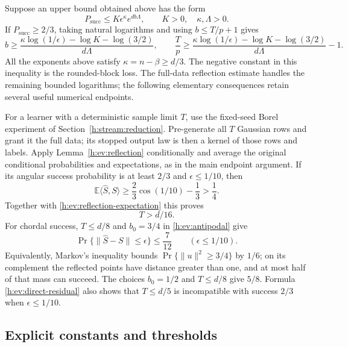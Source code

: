 Suppose an upper bound obtained above has the form
\[
 P_{\mathrm{succ}}\le K\epsilon^\kappa e^{d b\Lambda},
 \qquad K>0,\quad\kappa,\Lambda>0 .
\]
If \(P_{\mathrm{succ}}\ge2/3\), taking natural logarithms and using
\(b\le T/p+1\) gives
\begin{equation}\label{h:dv:log-extraction}
 b\ge
 \frac{\kappa\log(1/\epsilon)-\log K-\log(3/2)}{d\Lambda},
 \qquad
 \frac Tp\ge
 \frac{\kappa\log(1/\epsilon)-\log K-\log(3/2)}{d\Lambda}-1.
\end{equation}
All the exponents above satisfy \(\kappa=n-\beta\ge d/3\).
The negative constant in this inequality is the rounded-block loss.
The full-data reflection estimate handles the remaining bounded
logarithms; the following elementary consequences retain several
useful numerical endpoints.

For a learner with a deterministic sample limit \(T\), use the
fixed-seed Borel experiment of Section~\ref{h:stream:reduction}.
Pre-generate all \(T\) Gaussian rows and grant it the full data;
its stopped output law is then a kernel of those rows and labels.
Apply Lemma~\ref{h:ev:reflection} conditionally and average the original
conditional probabilities and expectations, as in the main endpoint argument.
If its angular success
probability is at least \(2/3\) and \(\epsilon\le1/10\), then
\[
 \mathbb E\langle\widehat S,S\rangle
 \ge \frac23\cos(1/10)-\frac13>\frac14.
\]
Together with \eqref{h:ev:reflection-expectation} this proves
\begin{equation}\label{h:ev:reflection-sixteenth}
 T>d/16.
\end{equation}
For chordal success, \(T\le d/8\) and \(b_0=3/4\) in
\eqref{h:ev:antipodal} give
\begin{equation}\label{h:ev:reflection-seven-twelfths}
 \Pr\{\|\widehat S-S\|\le\epsilon\}\le\frac7{12}
 \qquad(\epsilon\le1/10).
\end{equation}
Equivalently, Markov's inequality bounds
\(\Pr\{\|u\|^2\ge3/4\}\) by \(1/6\); on its complement the reflected
points have distance greater than one, and at most half of that mass
can succeed.  The choices \(b_0=1/2\) and \(T\le d/8\) give \(5/8\).
Formula \eqref{h:ev:direct-residual} also shows that \(T\le d/5\) is
incompatible with success \(2/3\) when \(\epsilon\le1/10\).

\subsection{Explicit constants and thresholds}

